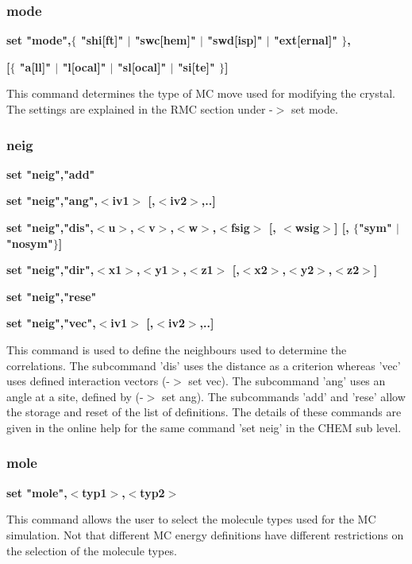 \subsubsection{mode}
{\bf set "mode",$ \{$ "shi[ft]" $| $ "swc[hem]" $| $ "swd[isp]" $| $ "ext[ernal]" $\} $, \par }
{\bf           [$ \{$ "a[ll]"   $| $ "l[ocal]"  $| $ "sl[ocal]" $| $ "si[te]"     $\} $] \par }
\par
\vspace{3pt}
This command determines the type of MC move used for modifying 
the crystal. The settings are explained in the RMC section under 
-$> $ set mode. 
\subsubsection{neig}
{\bf set "neig","add" \par }
{\bf set "neig","ang",$ <$iv1$> $ [,$ <$iv2$> $,..] \par }
{\bf set "neig","dis",$ <$u$> $,$ <$v$> $,$ <$w$> $,$ <$fsig$> $ [, $ <$wsig$> $] [, $ \{$"sym" $| $ "nosym"$\} $] \par }
{\bf set "neig","dir",$ <$x1$> $,$ <$y1$> $,$ <$z1$> $ [,$ <$x2$> $,$ <$y2$> $,$ <$z2$> $] \par }
{\bf set "neig","rese" \par }
{\bf set "neig","vec",$ <$iv1$> $ [,$ <$iv2$> $,..] \par }
\par
\vspace{3pt}
This command is used to define the neighbours used to determine the 
correlations. The subcommand 'dis' uses the distance as a criterion 
whereas 'vec' uses defined interaction vectors (-$> $ set vec). The 
subcommand 'ang' uses an angle at a site, defined by (-$> $ set ang). The 
subcommands 'add' and 'rese' allow the storage and reset of the 
list of definitions. The details of these commands are given in the 
online help for the same command 'set neig' in the CHEM sub level. 
\subsubsection{mole}
{\bf set "mole",$ <$typ1$> $,$ <$typ2$> $ \par }
\par
\vspace{3pt}
This command allows the user to select the molecule types used for 
the MC simulation. Not that different MC energy definitions have 
different restrictions on the selection of the molecule types. 
